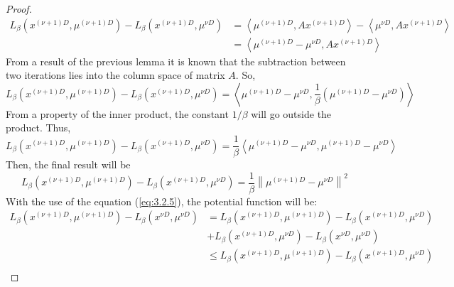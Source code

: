 \begin{proof}
        \begin{equation*}
            \begin{align}
                L_{\beta}(x^{(\nu + 1)D}, \mu^{(\nu + 1)D})- L_{\beta}(x^{(\nu + 1)D}, \mu^{\nu D}) &= \left\langle \mu^{(\nu + 1)D}, Ax^{(\nu + 1)D} \right \rangle -\left\langle \mu^{\nu D}, Ax^{(\nu + 1)D}\right\rangle\\
                &= \left\langle \mu^{(\nu + 1)D} - \mu^{\nu D}, Ax^{(\nu + 1)D}\right\rangle
            \end{align}
        \end{equation*}
        From a result of the previous lemma it is known that the subtraction between two iterations lies into the column space of matrix $A$. So,
        \begin{equation*}
            L_{\beta}(x^{(\nu + 1)D}, \mu^{(\nu + 1)D})- L_{\beta}(x^{(\nu + 1)D}, \mu^{\nu D}) = \left\langle \mu^{(\nu + 1)D} - \mu^{\nu D}, \frac{1}{\beta}\left(\mu^{(\nu + 1)D} - \mu^{\nu D}\right) \right\rangle
        \end{equation*}
        From a property of the inner product, the constant $1/\beta$ will go outside the product. Thus,
        \begin{equation*}
            L_{\beta}(x^{(\nu + 1)D}, \mu^{(\nu + 1)D})- L_{\beta}(x^{(\nu + 1)D}, \mu^{\nu D}) = \frac{1}{\beta}\left\langle \mu^{(\nu + 1)D} - \mu^{\nu D},\mu^{(\nu + 1)D} - \mu^{\nu D}\right\rangle
        \end{equation*}
        Then, the final result will be
        \begin{equation}\label{eq:3.2.5}
            L_{\beta}(x^{(\nu + 1)D}, \mu^{(\nu + 1)D})- L_{\beta}(x^{(\nu + 1)D}, \mu^{\nu D}) = \frac{1}{\beta} \left \lVert \mu^{(\nu + 1)D} - \mu^{\nu D} \right \rVert^2
        \end{equation}
        With the use of the equation (\ref{eq:3.2.5}), the potential function will be:
        \begin{equation*}
            \begin{align}
                L_{\beta}(x^{(\nu + 1)D}, \mu^{(\nu + 1)D}) - L_{\beta}(x^{\nu D}, \mu^{\nu D}) &=  L_{\beta}(x^{(\nu + 1)D}, \mu^{(\nu + 1)D}) - L_{\beta}(x^{(\nu + 1)D}, \mu^{\nu D}) \\&+ L_{\beta}(x^{(\nu + 1)D}, \mu^{\nu D}) - L_{\beta}(x^{\nu D}, \mu^{\nu D}) \\
                &\leq  L_{\beta}(x^{(\nu + 1)D}, \mu^{(\nu + 1)D}) - L_{\beta}(x^{(\nu + 1)D}, \mu^{\nu D}) \\ 

\end{align}
\end{equation*}
\end{proof}
